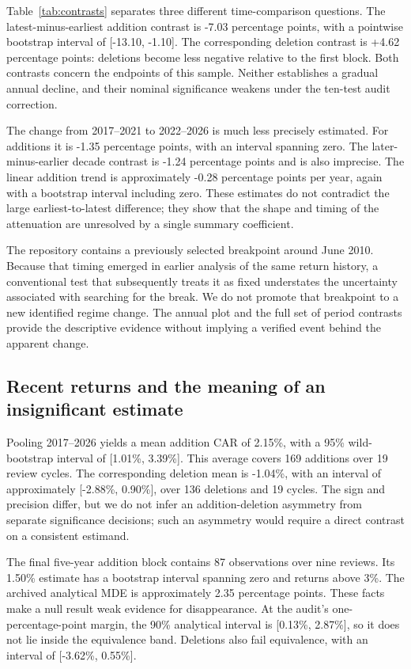 Table~\ref{tab:contrasts} separates three different time-comparison questions. The latest-minus-earliest addition contrast is -7.03 percentage points, with a pointwise bootstrap interval of [-13.10, -1.10]. The corresponding deletion contrast is +4.62 percentage points: deletions become less negative relative to the first block. Both contrasts concern the endpoints of this sample. Neither establishes a gradual annual decline, and their nominal significance weakens under the ten-test audit correction.



The change from 2017--2021 to 2022--2026 is much less precisely estimated. For additions it is -1.35 percentage points, with an interval spanning zero. The later-minus-earlier decade contrast is -1.24 percentage points and is also imprecise. The linear addition trend is approximately -0.28 percentage points per year, again with a bootstrap interval including zero. These estimates do not contradict the large earliest-to-latest difference; they show that the shape and timing of the attenuation are unresolved by a single summary coefficient.

The repository contains a previously selected breakpoint around June 2010. Because that timing emerged in earlier analysis of the same return history, a conventional test that subsequently treats it as fixed understates the uncertainty associated with searching for the break. We do not promote that breakpoint to a new identified regime change. The annual plot and the full set of period contrasts provide the descriptive evidence without implying a verified event behind the apparent change.

\subsection{Recent returns and the meaning of an insignificant estimate}

Pooling 2017--2026 yields a mean addition CAR of 2.15\%, with a 95\% wild-bootstrap interval of [1.01\%, 3.39\%]. This average covers 169 additions over 19 review cycles. The corresponding deletion mean is -1.04\%, with an interval of approximately [-2.88\%, 0.90\%], over 136 deletions and 19 cycles. The sign and precision differ, but we do not infer an addition-deletion asymmetry from separate significance decisions; such an asymmetry would require a direct contrast on a consistent estimand.

The final five-year addition block contains 87 observations over nine reviews. Its 1.50\% estimate has a bootstrap interval spanning zero and returns above 3\%. The archived analytical MDE is approximately 2.35 percentage points. These facts make a null result weak evidence for disappearance. At the audit's one-percentage-point margin, the 90\% analytical interval is [0.13\%, 2.87\%], so it does not lie inside the equivalence band. Deletions also fail equivalence, with an interval of [-3.62\%, 0.55\%].

